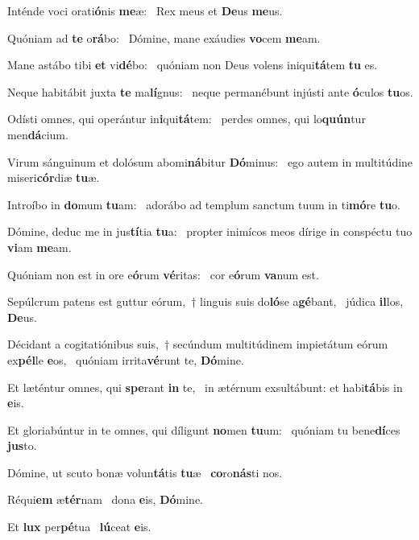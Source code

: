 \item Inténde voci orati\textbf{ó}nis \textbf{me}æ:~\psstar{} Rex meus et \textbf{De}us \textbf{me}us.

\item Quóniam ad \textbf{te} o\textbf{rá}bo:~\psstar{} Dómine, mane exáudies \textbf{vo}cem \textbf{me}am.

\item Mane astábo tibi \textbf{et} vi\textbf{dé}bo:~\psstar{} quóniam non Deus volens iniqui\textbf{tá}tem \textbf{tu} es.

\item Neque habitábit juxta \textbf{te} ma\textbf{lí}gnus:~\psstar{} neque permanébunt injústi ante \textbf{ó}culos \textbf{tu}os.

\item Odísti omnes, qui operántur in\textbf{i}qui\textbf{tá}tem:~\psstar{} perdes omnes, qui lo\textbf{quún}tur men\textbf{dá}cium.

\item Virum sánguinum et dolósum abomi\textbf{ná}bitur \textbf{Dó}minus:~\psstar{} ego autem in multitúdine miseri\textbf{cór}diæ \textbf{tu}æ.

\item Introíbo in \textbf{do}mum \textbf{tu}am:~\psstar{} adorábo ad templum sanctum tuum in ti\textbf{mó}re \textbf{tu}o.

\item Dómine, deduc me in jus\textbf{tí}tia \textbf{tu}a:~\psstar{} propter inimícos meos dírige in conspéctu tuo \textbf{vi}am \textbf{me}am.

\item Quóniam non est in ore e\textbf{ó}rum \textbf{vé}ritas:~\psstar{} cor e\textbf{ó}rum \textbf{va}num est.

\item Sepúlcrum patens est guttur eórum,~† linguis suis do\textbf{ló}se a\textbf{gé}bant,~\psstar{} júdica \textbf{il}los, \textbf{De}us.

\item Décidant a cogitatiónibus suis,~† secúndum multitúdinem impietátum eórum ex\textbf{pél}le \textbf{e}os,~\psstar{} quóniam irrita\textbf{vé}runt te, \textbf{Dó}mine.

\item Et læténtur omnes, qui \textbf{spe}rant \textbf{in} te,~\psstar{} in ætérnum exsultábunt: et habi\textbf{tá}bis in \textbf{e}is.

\item Et gloriabúntur in te omnes, qui díligunt \textbf{no}men \textbf{tu}um:~\psstar{} quóniam tu bene\textbf{dí}ces \textbf{jus}to.

\item Dómine, ut scuto bonæ volun\textbf{tá}tis \textbf{tu}æ~\psstar{} \textbf{co}ro\textbf{nás}ti nos.
\item Réqui\textbf{em} æ\textbf{tér}nam~\psstar{} dona \textbf{e}is, \textbf{Dó}mine.
\item Et \textbf{lux} per\textbf{pé}tua~\psstar{} \textbf{lú}ceat \textbf{e}is.